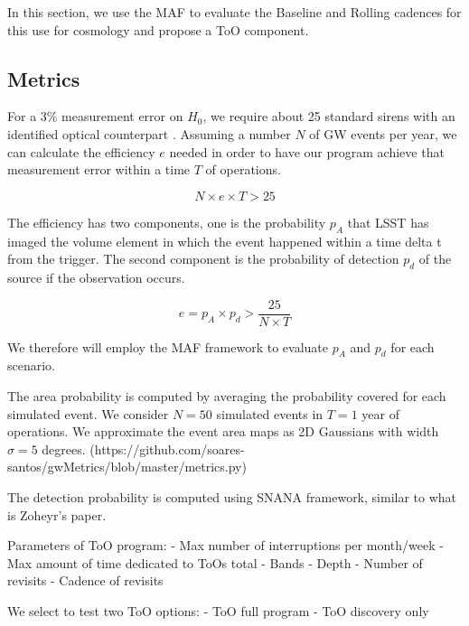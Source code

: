In this section, we use the MAF to evaluate the Baseline and Rolling cadences
for this use for cosmology and propose a ToO component. 


\subsection{Metrics}
\label{sec:\secname:metrics}





For a 3\% measurement error on $H_0$, we require about 25 standard sirens 
with an identified optical counterpart \cite{13095382}.
Assuming a number $N$ of GW events per year, we can calculate the 
efficiency $e$ needed in order to have our program achieve that measurement error 
within a time $T$ of operations. 

$$N \times e \times T > 25$$

The efficiency has two components, one is the probability $p_A$ that LSST has imaged 
the volume element in which the event happened within a time delta t from the trigger. 
The second component is the probability of detection $p_d$ of the source if the observation 
occurs. 

$$ e = p_A \times p_d > \frac{25}{N \times T}$$

We therefore will employ the MAF framework to evaluate $p_A$ and $p_d$ for each scenario.

The area probability is computed by averaging the probability covered for each simulated
event. We consider $N=50$ simulated events in $T=1$ year of operations. 
We approximate the event area maps as 2D Gaussians with width $\sigma= 5$ degrees.  
(https://github.com/soares-santos/gwMetrics/blob/master/metrics.py)

The detection probability is computed using SNANA framework, similar to what is 
Zoheyr's paper. 

Parameters of ToO program:
- Max number of interruptions per month/week
- Max amount of time dedicated to ToOs total
- Bands 
- Depth 
- Number of revisits
- Cadence of revisits

We select to test two ToO options:
- ToO full program
- ToO discovery only 






